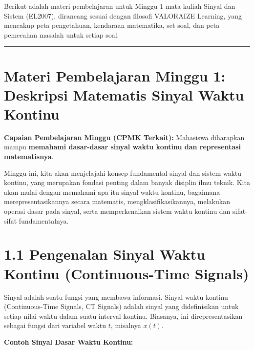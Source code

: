\documentclass[
  letterpaper,
  DIV=11,
  numbers=noendperiod]{scrreprt}
\begin{document}
Berikut adalah materi pembelajaran untuk Minggu 1 mata kuliah Sinyal dan
Sistem (EL2007), dirancang sesuai dengan filosofi VALORAIZE Learning,
yang mencakup peta pengetahuan, kendaraan matematika, set soal, dan peta
pemecahan masalah untuk setiap soal.

\begin{center}\rule{0.5\linewidth}{0.5pt}\end{center}

\section{Materi Pembelajaran Minggu 1: Deskripsi Matematis Sinyal Waktu
Kontinu}\label{materi-pembelajaran-minggu-1-deskripsi-matematis-sinyal-waktu-kontinu}

\textbf{Capaian Pembelajaran Minggu (CPMK Terkait):} Mahasiswa
diharapkan mampu \textbf{memahami dasar-dasar sinyal waktu kontinu dan
representasi matematisnya}.

Minggu ini, kita akan menjelajahi konsep fundamental sinyal dan sistem
waktu kontinu, yang merupakan fondasi penting dalam banyak disiplin ilmu
teknik. Kita akan mulai dengan memahami apa itu sinyal waktu kontinu,
bagaimana merepresentasikannya secara matematis, mengklasifikasikannya,
melakukan operasi dasar pada sinyal, serta memperkenalkan sistem waktu
kontinu dan sifat-sifat fundamentalnya.

\section{1.1 Pengenalan Sinyal Waktu Kontinu (Continuous-Time
Signals)}\label{pengenalan-sinyal-waktu-kontinu-continuous-time-signals}

Sinyal adalah suatu fungsi yang membawa informasi. Sinyal waktu kontinu
(Continuous-Time Signals, CT Signals) adalah sinyal yang didefinisikan
untuk setiap nilai waktu dalam suatu interval kontinu. Biasanya, ini
direpresentasikan sebagai fungsi dari variabel waktu \(t\), misalnya
\(x(t)\).

\textbf{Contoh Sinyal Dasar Waktu Kontinu:}
\end{document}
